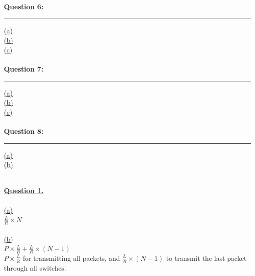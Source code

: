 \documentclass[12pt]{article}
\begin{document}
{\textbf{Question 6:}}
\vspace{1mm}
\hrule
\vspace{1mm}
\hyperlink{6.1}{(a)}\\
\hyperlink{6.2}{(b)}\\
\hyperlink{6.3}{(c)}\\
\\

{\textbf{Question 7:}}
\vspace{1mm}
\hrule
\vspace{1mm}
\hyperlink{7.1}{(a)}\\
\hyperlink{7.2}{(b)}\\
\hyperlink{7.3}{(c)}\\
\\

{\textbf{Question 8:}}
\vspace{1mm}
\hrule
\vspace{1mm}
\hyperlink{8.1}{(a)}\\
\hyperlink{8.2}{(b)}\\
\\

\newpage

\hyperlink{toc}{\LARGE \underline{\textbf{Question 1.}}}\\
~\\\hyperlink{toc}{\hypertarget{1.1}{(a)}}\\
$\frac{L}{R} \times N$\\
~\\\hyperlink{toc}{\hypertarget{1.2}{(b)}}\\
$P \times \frac{L}{R} + \frac{L}{R} \times (N-1)$\\
$P \times \frac{L}{R}$ for transmitting all packets, and $\frac{L}{R} \times (N-1)$ to transmit the last packet through all switches.
\newpage
\end{document}
